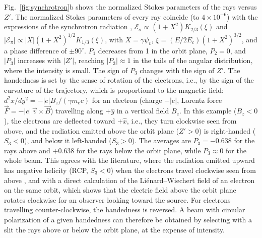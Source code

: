 \documentclass{iucr}
\begin{document}
Fig.~\ref{fig:synchrotron}b shows the normalized Stokes parameters of the rays versus $Z'$. The normalized Stokes parameters of every ray coincide (to $4\times10^{-6}$) with the expressions of the synchrotron radiation \cite{Jackson1999,xraydatabooklet}, $\mathcal{E}_\sigma\propto(1+X^2)K_{2/3}(\xi)$ and $|\mathcal{E}_\pi|\propto|X|(1+X^2)^{1/2}K_{1/3}(\xi)$, with $X=\gamma\psi_v$, $\xi=(E/2E_c)(1+X^2)^{3/2}$, and a phase difference of $\pm90^\circ$. $P_1$ decreases from 1 in the orbit plane, $P_2=0$, and $|P_3|$ increases with $|Z'|$, reaching $|P_3|\approx1$ in the tails of the angular distribution, where the intensity is small. The sign of $P_3$ changes with the sign of $Z'$. The handedness is set by the sense of rotation of the electrons, i.e., by the sign of the curvature of the trajectory, which is proportional to the magnetic field: $d^2x/dy^2=-|e| B_z/(\gamma m_e c)$ for an electron (charge $-|e|$, Lorentz force $\vec{F}=-|e|\,\vec{v}\times\vec{B}$) travelling along $+\hat{y}$ in a vertical field $B_z$. In this example ($B_z<0$), the electrons are deflected toward $+\hat{x}$, i.e., they turn clockwise seen from above, and the radiation emitted above the orbit plane ($Z'>0$) is right-handed ($S_3<0$), and below it left-handed ($S_3>0$). The averages are $P_3=-0.638$ for the rays above and $+0.638$ for the rays below the orbit plane, while $P_3\approx0$ for the whole beam. This agrees with the literature, where the radiation emitted upward has negative helicity (RCP, $S_3<0$) when the electrons travel clockwise seen from above \cite{Schafers2008}, and with a direct calculation of the Li\'enard--Wiechert field of an electron on the same orbit, which shows that the electric field above the orbit plane rotates clockwise for an observer looking toward the source. For electrons travelling counter-clockwise, the handedness is reversed. A beam with circular polarization of a given handedness can therefore be obtained by selecting with a slit the rays above or below the orbit plane, at the expense of intensity.
\end{document}
